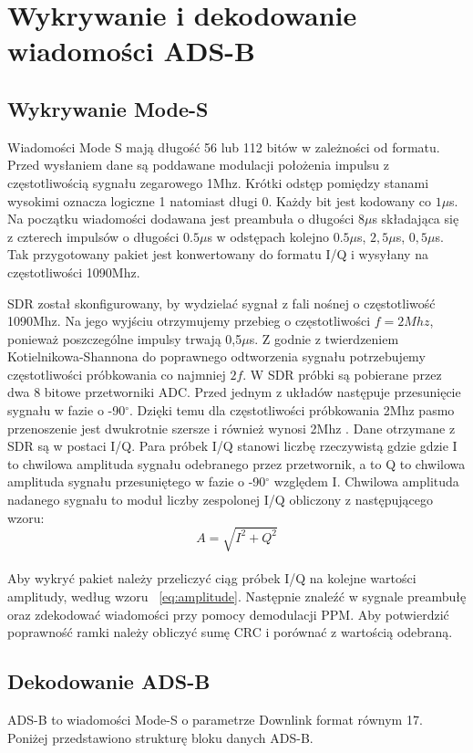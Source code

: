 \documentclass[eng,printmode]{mgr}
\begin{document}
\section{Wykrywanie i dekodowanie wiadomości ADS-B}
\subsection*{Wykrywanie Mode-S}
Wiadomości Mode S mają długość 56 lub 112 bitów w zależności od formatu. Przed wysłaniem dane są poddawane modulacji położenia impulsu z częstotliwością sygnału zegarowego 1Mhz. Krótki odstęp pomiędzy stanami wysokimi oznacza logiczne 1 natomiast długi 0. 
Każdy bit jest kodowany co $1\mu$s. Na początku wiadomości dodawana jest preambuła o długości $8\mu$s składająca się z czterech impulsów o długości $0.5\mu$s w odstępach kolejno $0.5\mu$s, $2,5\mu$s, $0,5\mu$s. Tak przygotowany pakiet jest konwertowany do formatu I/Q i wysyłany na częstotliwości 1090Mhz.


SDR został skonfigurowany, by wydzielać sygnał z fali nośnej o częstotliwość 1090Mhz.
Na jego wyjściu otrzymujemy przebieg o częstotliwości $f=2Mhz$, ponieważ poszczególne impulsy trwają 0,5$\mu$s. Z godnie z twierdzeniem Kotielnikowa-Shannona do poprawnego odtworzenia sygnału potrzebujemy częstotliwości próbkowania co najmniej $2f$. W SDR próbki są pobierane przez dwa 8 bitowe przetworniki ADC. Przed jednym z układów następuje przesunięcie sygnału w fazie o -90$^\circ$. Dzięki temu dla częstotliwości próbkowania 2Mhz pasmo przenoszenie jest dwukrotnie szersze i również wynosi 2Mhz \cite{digit}. Dane otrzymane z SDR są w postaci I/Q. Para próbek I/Q stanowi liczbę rzeczywistą gdzie gdzie I to chwilowa amplituda sygnału odebranego przez przetwornik, a to Q to chwilowa amplituda sygnału przesuniętego w fazie o -90$^\circ$ względem I. Chwilowa amplituda nadanego sygnału to moduł liczby zespolonej I/Q obliczony z następującego wzoru:
\\
\begin{equation}
\label{eq:amplitude}
A = \sqrt{I^2 + Q^2}
\end{equation}
\\
Aby wykryć pakiet należy przeliczyć ciąg próbek I/Q na kolejne wartości amplitudy, według wzoru ~\ref{eq:amplitude}. Następnie znaleźć w sygnale preambułę oraz zdekodować wiadomości przy pomocy demodulacji PPM. Aby potwierdzić poprawność ramki należy obliczyć sumę CRC i porównać z wartością odebraną.
\\

\subsection*{Dekodowanie ADS-B}
ADS-B to wiadomości Mode-S o parametrze Downlink format równym 17. Poniżej przedstawiono strukturę bloku danych ADS-B.
\end{document}
